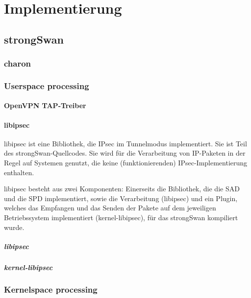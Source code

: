 


\section{Implementierung}

\subsection{strongSwan}
\subsubsection{charon}
\subsubsection{Userspace processing}
\paragraph{OpenVPN TAP-Treiber}
\paragraph{libipsec}
libipsec ist eine Bibliothek, die IPsec im Tunnelmodus implementiert.
Sie ist Teil des strongSwan-Quellcodes. Sie wird für die Verarbeitung von IP-Paketen
in der Regel auf Systemen genutzt, die keine (funktionierenden) IPsec-Implementierung
enthalten.

libipsec besteht aus zwei Komponenten: Einerseits die Bibliothek, die die SAD und die SPD
implementiert, sowie die Verarbeitung (libipsec) und ein Plugin, welches das Empfangen und das Senden
der Pakete auf dem jeweiligen Betriebssystem implementiert (kernel-libipsec), für das strongSwan kompiliert wurde.

\subparagraph{libipsec}
\subparagraph{kernel-libipsec}

\subsubsection{Kernelspace processing}

